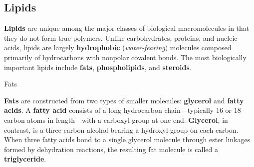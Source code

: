 \documentclass[10pt]{article}
\begin{document}
  \subsection{Lipids}

    \textbf{Lipids} are unique among the major classes of biological macromolecules in that they do not form true polymers. Unlike carbohydrates, proteins, and nucleic acids, lipids are largely \textbf{hydrophobic} (\textit{water-fearing}) molecules composed primarily of hydrocarbons with nonpolar covalent bonds. The most biologically important lipids include \textbf{fats}, \textbf{phospholipids}, and \textbf{steroids}.

    \begin{core}{Fats}

      \textbf{Fats} are constructed from two types of smaller molecules: \textbf{glycerol} and \textbf{fatty acids}. A \textbf{fatty acid} consists of a long hydrocarbon chain—typically 16 or 18 carbon atoms in length—with a carboxyl group at one end. \textbf{Glycerol}, in contrast, is a three-carbon alcohol bearing a hydroxyl group on each carbon. When three fatty acids bond to a single glycerol molecule through ester linkages formed by dehydration reactions, the resulting fat molecule is called a \textbf{triglyceride}.


    \end{core}
\end{document}
